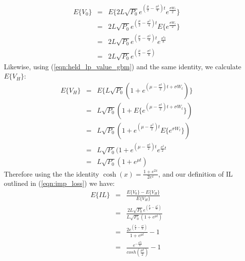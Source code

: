\documentclass[journal,twocolumn,12pt]{ieeesyscoin}
\begin{document}
\begin{eqnarray*}\label{eqn:derivation_exp_v0}
E\{V_{0}\} &=& E\{2L \sqrt{P_{0}} e^{(\frac{\mu}{2} - \frac{\sigma^2}{4})t } e^{\frac{\sigma W_{t}}{2}} \} \\ 
           &=& 2L \sqrt{P_{0}} e^{(\frac{\mu}{2} - \frac{\sigma^2}{4})t } E\{e^{ \frac{\sigma W_{t}}{2} }\} \\
           &=& 2L \sqrt{P_{0}} e^{(\frac{\mu}{2} - \frac{\sigma^2}{4})t } e^{\frac{\sigma^2 t}{8}} \\
           &=&  2L \sqrt{P_{0}}e^{( \frac{\mu}{2} - \frac{\sigma^2}{8})}
\end{eqnarray*}
Likewise, using (\ref{eqn:held_lp_value_gbm}) and the same identity, we calculate $E\{V_{H}\}$: 
\begin{eqnarray*}\label{eqn:derivation_exp_vH}
E\{V_{H}\} &=& E\{L \sqrt{P_{0}}(1 + e^{(\mu - \frac{\sigma^2}{2})t + \sigma W_{t} })\} \\
		   &=& L \sqrt{P_{0}}(1 + E\{ e^{(\mu - \frac{\sigma^2}{2})t + \sigma W_{t} }  \}) \\
		   &=& L \sqrt{P_{0}}(1 + e^{(\mu - \frac{\sigma^2}{2})t} E\{e^{\sigma W_{t}}\} ) \\
		   &=& L \sqrt{P_{0}}(1 + e^{(\mu - \frac{\sigma^2}{2})t} e^{\frac{\sigma^2}{2}t} \\
		   &=& L \sqrt{P_{0}}(1 + e^{\mu t} )
\end{eqnarray*}
Therefore using the the identity $\cosh(x) = \frac{1 + e^{2x}}{2 e^x}$, and our definition of IL outlined in (\ref{eqn:imp_loss})  we have:
\begin{eqnarray*}\label{eqn:derivation_exp_IL}
E\{IL\} &=& \frac{E\{V_{0}\} - E\{V_{H}\}}{E\{V_{H}\}} \\
		&=& \frac{2L \sqrt{P_{0}}e^{( \frac{\mu}{2} - \frac{\sigma^2}{8})} }{L \sqrt{P_{0}}(1 + e^{\mu t} )}\\
		&=& \frac{2e^{( \frac{\mu}{2} - \frac{\sigma^2}{8})}}{1 + e^{\mu t}} - 1\\
		&=& \frac{e^{-\frac{\sigma^2 t}{8}}}{ cosh(\frac{\mu t}{2})} - 1
\end{eqnarray*}
\end{document}
